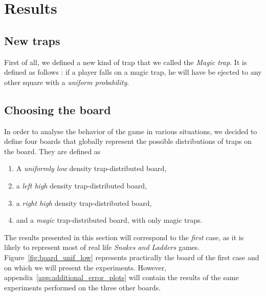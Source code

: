 \section{Results} %
\label{sec:results}

\subsection{New traps} %
\label{sub:new_traps}
First of all, we defined a new kind of trap that we called the \emph{Magic trap}. 
It is defined as follows : if a player falls on a magic trap, 
he will have be ejected to any other square with a \emph{uniform probability}. 


\subsection{Choosing the board} %
\label{sub:choosing_the_board}
In order to analyse the behavior of the game in various situations,
we decided to define four boards that globally represent the possible
distributions of traps on the board. They are defined as
\begin{enumerate}
  \item A \emph{uniformly low} density trap-distributed board,
  \item a \emph{left high} density trap-distributed board,
  \item a \emph{right high} density trap-distributed board,
  \item and a \emph{magic} trap-distributed board, with only magic traps.
\end{enumerate}
The results presented in this section will correspond to the \emph{first} case,
as it is likely to represent most of real life \emph{Snakes and Ladders} games.
Figure~\ref{fig:board_unif_low} represents practically the board 
of the first case and on which we will present the experiments.
However, appendix~\ref{app:additional_error_plots} will contain the results
of the same experiments performed on the three other boards.

